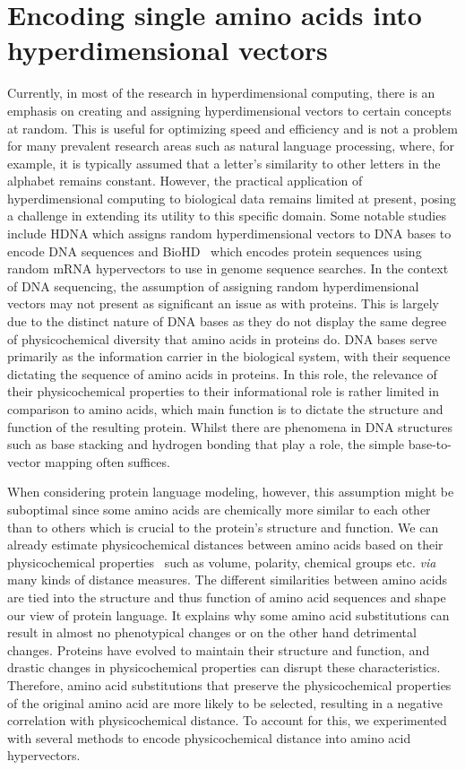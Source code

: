 \section{Encoding single amino acids into hyperdimensional vectors}
Currently, in most of the research in hyperdimensional computing, there is an emphasis on creating and assigning hyperdimensional vectors to certain concepts at random. This is useful for optimizing speed and efficiency and is not a problem for many prevalent research areas such as natural language processing, where, for example, it is typically assumed that a letter's similarity to other letters in the alphabet remains constant. However, the practical application of hyperdimensional computing to biological data remains limited at present, posing a challenge in extending its utility to this specific domain. Some notable studies include HDNA which assigns random hyperdimensional vectors to DNA bases to encode DNA sequences and BioHD~\cite{biohd} which encodes protein sequences using random mRNA hypervectors to use in genome sequence searches. In the context of DNA sequencing, the assumption of assigning random hyperdimensional vectors may not present as significant an issue as with proteins. This is largely due to the distinct nature of DNA bases as they do not display the same degree of physicochemical diversity that amino acids in proteins do. DNA bases serve primarily as the information carrier in the biological system, with their sequence dictating the sequence of amino acids in proteins. In this role, the relevance of their physicochemical properties to their informational role is rather limited in comparison to amino acids, which main function is to dictate the structure and function of the resulting protein. Whilst there are phenomena in DNA structures such as base stacking and hydrogen bonding that play a role, the simple base-to-vector mapping often suffices.

When considering protein language modeling, however, this assumption might be suboptimal since some amino acids are chemically more similar to each other than to others which is crucial to the protein's structure and function. We can already estimate physicochemical distances between amino acids based on their physicochemical properties~\cite{physicochem} such as volume, polarity, chemical groups etc. \textit{via} many kinds of distance measures. The different similarities between amino acids are tied into the structure and thus function of amino acid sequences and shape our view of protein language. It explains why some amino acid substitutions can result in almost no phenotypical changes or on the other hand detrimental changes. Proteins have evolved to maintain their structure and function, and drastic changes in physicochemical properties can disrupt these characteristics. Therefore, amino acid substitutions that preserve the physicochemical properties of the original amino acid are more likely to be selected, resulting in a negative correlation with physicochemical distance. To account for this, we experimented with several methods to encode physicochemical distance into amino acid hypervectors.

